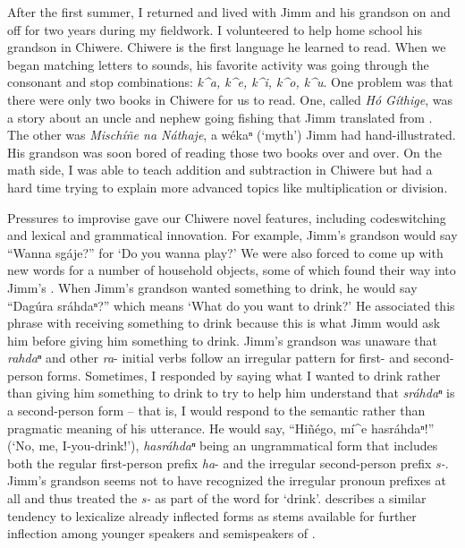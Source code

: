 \documentclass[output=paper]{LSP/langsci}
\begin{document}
After the first summer, I returned and lived with Jimm and his grandson on and off for two years during my fieldwork. I volunteered to help home school his grandson in Chiwere. Chiwere is the first language he learned to read. When we began matching letters to sounds, his favorite activity was going through the consonant and  stop combinations: \emph{k\^{ }a, k\^{ }e, k\^{ }i, k\^{ }o, k\^{ }u}. One problem was that there were only two books in Chiwere for us to read. One, called \emph{Hó Gíthige}, was a story about an uncle and nephew going fishing that Jimm translated from . The other was \emph{Mischíñe na Náthaje}, a wékaⁿ (`myth') Jimm had hand-illustrated. His grandson was soon bored of reading those two books over and over. On the math side, I was able to teach addition and subtraction in Chiwere but had a hard time trying to explain more advanced topics like multiplication or division.

Pressures to improvise gave our Chiwere novel features, including codeswitching and lexical and grammatical innovation. For example, Jimm's grandson would say ``Wanna sgáje?'' for `Do you wanna play?' We were also forced to come up with new words for a number of household objects, some of which found their way into Jimm's . When Jimm's grandson wanted something to drink, he would say ``Dagúra sráhdaⁿ?'' which means `What do you want to drink?' He associated this phrase with receiving something to drink because this is what Jimm would ask him before giving him something to drink. Jimm's grandson was unaware that \emph{rahdaⁿ} and other \emph{ra}- initial verbs follow an irregular  pattern for first- and second-person forms. Sometimes, I responded by saying what I wanted to drink rather than giving him something to drink to try to help him understand that \emph{sráhdaⁿ} is a second-person form -- that is, I would respond to the semantic rather than pragmatic meaning of his utterance. He would say, ``Hiñégo, mí\^{ }e hasráhdaⁿ!'' (`No, me, I-you-drink!'), \emph{hasráhdaⁿ} being an ungrammatical form that includes both the regular first-person prefix \emph{ha}- and the irregular second-person prefix \emph{s-}. Jimm's grandson seems not to have recognized the irregular pronoun prefixes at all and thus treated the \emph{s-} as part of the word for `drink'.  describes a similar tendency to lexicalize already inflected forms as stems available for further inflection among younger speakers and semispeakers of . 
\end{document}

